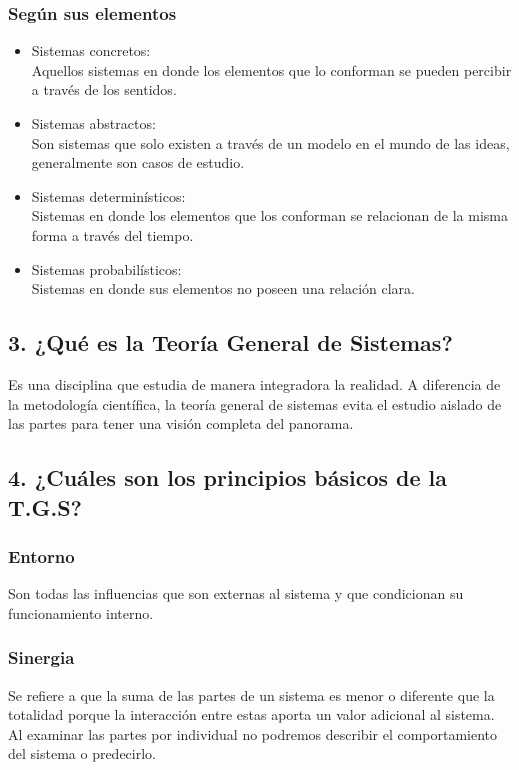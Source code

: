 \documentclass[a4paper,man,natbib]{apa6}
\begin{document}
\subsubsection{Según sus elementos}
\begin{itemize}
    \item Sistemas concretos:\\
          Aquellos sistemas en donde los elementos que lo conforman se pueden percibir a través de los sentidos.

    \item Sistemas abstractos:\\
          Son sistemas que solo existen a través de un modelo en el mundo de las ideas, generalmente son casos de estudio. \citep{10.2307/j.ctv1228hsw}

    \item Sistemas determinísticos:\\
          Sistemas en donde los elementos que los conforman se relacionan de la misma forma a través del tiempo. \citep{10.2307/j.ctv1228hsw}

    \item Sistemas probabilísticos:\\
          Sistemas en donde sus elementos no poseen una relación clara. \citep{10.2307/j.ctv1228hsw}


\end{itemize}

\subsection{3. ¿Qué es la Teoría General de Sistemas?}
Es una disciplina que estudia de manera integradora la realidad. A diferencia de la metodología científica, la teoría general de sistemas evita el estudio aislado de las partes para tener una visión completa del panorama. \citep{von1976teoria}

\subsection{4. ¿Cuáles son los principios básicos de la T.G.S?}
\subsubsection{Entorno}
Son todas las influencias que son externas al sistema y que condicionan su funcionamiento interno. \citep{10.2307/j.ctv1228hsw}

\subsubsection{Sinergia}
Se refiere a que la suma de las partes de un sistema es menor o diferente que la totalidad porque la interacción entre estas aporta un valor adicional al sistema. Al examinar las partes por individual no podremos describir el comportamiento del sistema o predecirlo.\citep{10.2307/j.ctv1228hsw}
\end{document}
